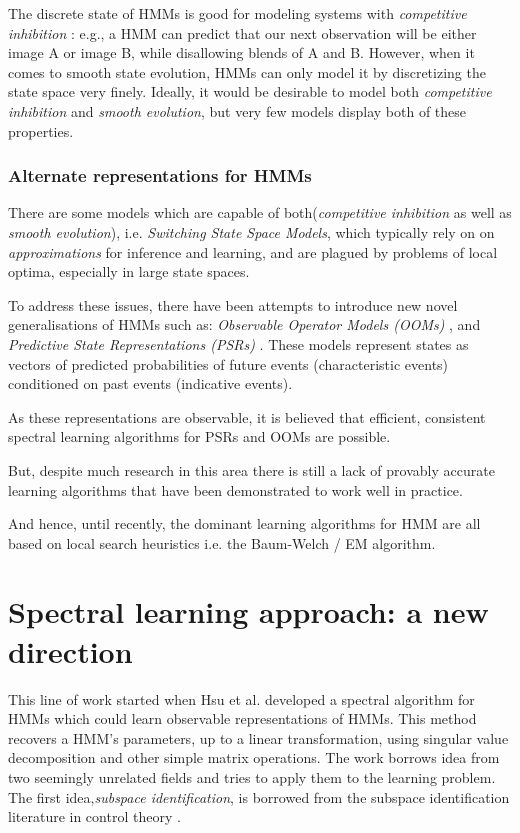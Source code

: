 The discrete state of HMMs is good for modeling systems with \textit{competitive inhibition} \cite{ref7}: e.g., a
HMM can predict that our next observation will be either image A or image B, while disallowing blends of A and B. \newline
\newline
However, when it comes to smooth state evolution, HMMs can only model it by discretizing the state space very finely. 
Ideally, it would be desirable to model both \textit{competitive inhibition} and \textit{smooth evolution}, but very few models display both of these properties.

\subsubsection{Alternate representations for HMMs}

There are some models which are capable of both(\textit{competitive inhibition} as well as \textit{smooth evolution}), i.e. \textit{Switching State Space
Models}\cite{ref8}, which typically rely
on on \textit{approximations} for inference and learning, and are plagued by problems of local optima, especially in large state spaces.
\par

To address these issues, there have been attempts to introduce new novel generalisations of HMMs such as: \textit{Observable Operator Models
(OOMs)} \cite{ref9}, and \textit{Predictive State Representations
(PSRs)} \cite{ref10}. These models represent states as vectors of predicted probabilities of future events (characteristic events) conditioned on past events (indicative
events). 

As these representations are observable, it is believed that efficient, consistent spectral
learning algorithms for PSRs and OOMs are possible. 

But, despite much research in this area there is still a lack of provably accurate learning algorithms that have been demonstrated to work well in practice.

And hence, until recently, the dominant learning algorithms for HMM are all based on local search heuristics i.e. the Baum-Welch / EM algorithm.


\section{Spectral learning approach: a new direction}

This line of work started when Hsu et al.\cite{ref2}
developed a spectral algorithm for HMMs which could learn observable representations of HMMs. This method recovers a HMM’s parameters, up to a linear transformation, using singular value decomposition and other simple matrix operations.
\newline
\newline
The work borrows idea from two seemingly unrelated fields and tries to apply them to the learning problem.
\newline
\newline
The first idea,\textit{subspace identification}, is borrowed from the subspace identification literature in control theory \cite{ref12} \cite{ref13}. 
\newline
